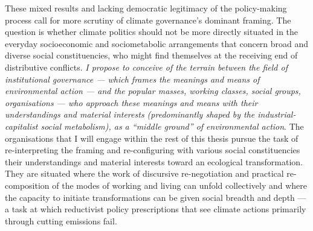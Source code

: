 \documentclass[a4paper, nobind]{templates/ociamthesis}
\begin{document}
These mixed results and lacking democratic legitimacy of the policy-making process call for more scrutiny of climate governance's dominant framing. The question is whether climate politics should not be more directly situated in the everyday socioeconomic and sociometabolic arrangements that concern broad and diverse social constituencies, who might find themselves at the receiving end of distributive conflicts. \emph{I propose to conceive of the terrain between the field of institutional governance --- which frames the meanings and means of environmental action --- and the popular masses, working classes, social groups, organisations --- who approach these meanings and means with their understandings and material interests (predominantly shaped by the industrial-capitalist social metabolism), as a ``middle ground'' of environmental action}. The organisations that I will engage within the rest of this thesis pursue the task of re-interpreting the framing and re-configuring with various social constituencies their understandings and material interests toward an ecological transformation. They are situated where the work of discursive re-negotiation and practical re-composition of the modes of working and living can unfold collectively and where the capacity to initiate transformations can be given social breadth and depth --- a task at which reductivist policy prescriptions that see climate actions primarily through cutting emissions fail.
\end{document}
